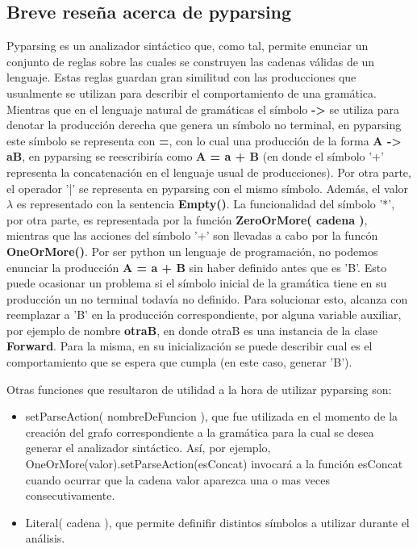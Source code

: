 \documentclass[a4paper]{report}
\begin{document}
\subsection*{Breve rese\~{n}a acerca de pyparsing}
Pyparsing es un analizador sint\'actico que, como tal, permite enunciar un conjunto de reglas sobre las cuales se construyen las cadenas v\'alidas de un lenguaje. Estas reglas guardan gran similitud con las producciones que usualmente se utilizan para describir el comportamiento de una gram\'atica. Mientras que en el lenguaje natural de gram\'aticas el s\'imbolo \textbf{->} se utiliza para denotar la producci\'on derecha que genera un s\'imbolo no terminal, en pyparsing este s\'imbolo se representa con \textbf{=}, con lo cual una producci\'on de la forma \textbf{A -> aB}, en pyparsing se reescribir\'ia como \textbf{A = a + B} (en donde el s\'imbolo '+' representa la concatenaci\'on en el lenguaje usual de producciones). Por otra parte, el operador '|' se representa en pyparsing con el mismo s\'imbolo. Adem\'as, el valor $\lambda$ es representado con la sentencia \textbf{Empty()}. La funcionalidad del s\'imbolo '*', por otra parte, es representada por la funci\'on \textbf{ZeroOrMore( cadena )}, mientras que las acciones del s\'imbolo '+' son llevadas a cabo por la func\'on \textbf{OneOrMore()}. Por ser python un lenguaje de programaci\'on, no podemos enunciar la producci\'on \textbf{A = a + B} sin haber definido antes que es 'B'. Esto puede ocasionar un problema si el s\'imbolo inicial de la gram\'atica tiene en su producci\'on un no terminal todav\'ia no definido. Para solucionar esto, alcanza con reemplazar a 'B' en la producci\'on correspondiente, por alguna variable auxiliar, por ejemplo de nombre \textbf{otraB}, en donde otraB es una instancia de la clase \textbf{Forward}. Para la misma, en su inicializaci\'on se puede describir cual es el comportamiento que se espera que cumpla (en este caso, generar 'B').

Otras funciones que resultaron de utilidad a la hora de utilizar pyparsing son:

\begin{itemize}
	\item setParseAction( nombreDeFuncion ), que fue utilizada en el momento de la creaci\'on del grafo correspondiente a la gram\'atica para la cual se desea generar el analizador sint\'actico. As\'i, por ejemplo, OneOrMore(valor).setParseAction(esConcat) invocar\'a a la funci\'on esConcat cuando ocurrar que la cadena valor aparezca una o mas veces consecutivamente.
	\item Literal( cadena ), que permite definifir distintos 
s\'imbolos a utilizar durante el an\'alisis.
\end{itemize}
\end{document}
